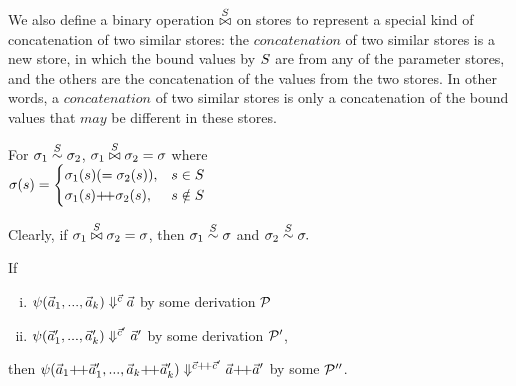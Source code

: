 We also define a binary operation $\x\S$ on stores to represent a special kind of concatenation of two similar stores: 
the $concatenation$ of two similar stores is a new store, in which the bound values by $\S$ are from any of the parameter stores, and 
the others are the concatenation of the values from the two stores. 
In other words, a $concatenation$ of two similar stores is only a concatenation of the bound values that $may$ be different in these stores.
\begin{defi} \label{def-sgm-join}
	For $\sgm_1 \~\S \sgm_2$,
	$\sgm_1 \x{\S} \sgm_2 = \sgm$ where \\
	$\sgm(s) =
	\begin{cases}
	\sgm_1(s) (=\sgm_2(s)), & s \in \S\\
	\sgm_1(\s) {\++} \sgm_2(s), & s \notin \S \\
	\end{cases} $
\end{defi}

Clearly, if $\sgm_1 \x{\S} \sgm_2 = \sgm$, 
	then $\sgm_1 \~{\S} \sgm$ and $\sgm_2 \~{\S} \sgm.$



\begin{lem} \label{lem-psi-join}
	If \begin{enumerate}[(i)]
	 \item $\sevalfg{\lcall}{\a_{1},...,\a_{k}}{\c}{\a}$ by some derivation $\MP$
	 \item $\sevalfg{\lcall}{\a'_{1},...,\a'_{k}}{\c'}{\a'}$ by some derivation $\MP'$,
	\end{enumerate}
	then $\sevalfg{\lcall}{\a_{1} {\++} \a'_{1},...,\a_{k} {\++} \a'_{k}}{\c {\++} \c'}{\a {\++} \a'}$ by some $\MP''$.
\end{lem}

